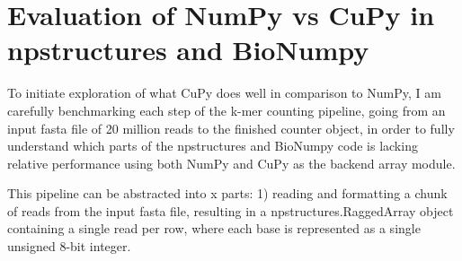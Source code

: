 \section{Evaluation of NumPy vs CuPy in npstructures and BioNumpy}
To initiate exploration of what CuPy does well in comparison to NumPy, I am carefully benchmarking each step of the k-mer counting pipeline, going from an input fasta file of 20 million reads to the finished counter object, in order to fully understand which parts of the npstructures and BioNumpy code is lacking relative performance using both NumPy and CuPy as the backend array module.

This pipeline can be abstracted into x parts: 1) reading and formatting a chunk of reads from the input fasta file, resulting in a npstructures.RaggedArray object containing a single read per row, where each base is represented as a single unsigned 8-bit integer.
